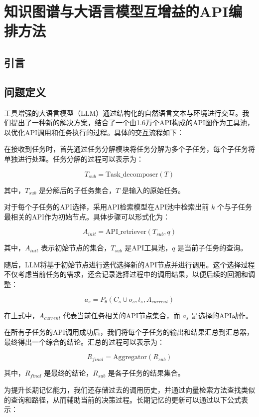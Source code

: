 \chapter{知识图谱与大语言模型互增益的API编排方法}

\section{引言}
\label{sec:intro}

\section{问题定义}

工具增强的大语言模型（LLM）通过结构化的自然语言文本与环境进行交互。我们提出了一种新的解决方案，结合了一个由1.6万个API构成的API图作为工具池，以优化API调用和任务执行的过程。具体的交互流程如下：

在接收到任务时，首先通过任务分解模块将任务分解为多个子任务，每个子任务将单独进行处理。任务分解的过程可以表示为：

\[
T_{sub} = \text{Task\_decomposer}(T) \tag{1}
\]

其中，\( T_{sub} \) 是分解后的子任务集合，\( T \) 是输入的原始任务。

对于每个子任务的API选择，采用API检索模型在API池中检索出前 \( k \) 个与子任务最相关的API作为初始节点。具体步骤可以形式化为：

\[
A_{init} = \text{API\_retriever}(T_{sub}, q) \tag{2}
\]

其中，\( A_{init} \) 表示初始节点的集合，\( T_{sub} \) 是API工具池，\( q \) 是当前子任务的查询。

随后，LLM将基于初始节点进行迭代选择新的API节点并进行调用。这个选择过程不仅考虑当前任务的需求，还会记录选择过程中的调用结果，以便后续的回溯和调整：

\[
a_s = P_\theta(C_s \cup o_s, t_s, A_{current}) \tag{3}
\]

在上式中，\( A_{current} \) 代表当前任务相关的API节点集合，而 \( a_s \) 是选择的API动作。

在所有子任务的API调用成功后，我们将每个子任务的输出和结果汇总到汇总器，最终得出一个综合的结论。汇总的过程可以表示为：

\[
R_{final} = \text{Aggregator}(R_{sub}) \tag{4}
\]

其中，\( R_{final} \) 是最终的结论，\( R_{sub} \) 是各子任务的结果集合。

为提升长期记忆能力，我们还存储过去的调用历史，并通过向量检索方法查找类似的查询和路径，从而辅助当前的决策过程。长期记忆的更新可以通过以下公式表示：

